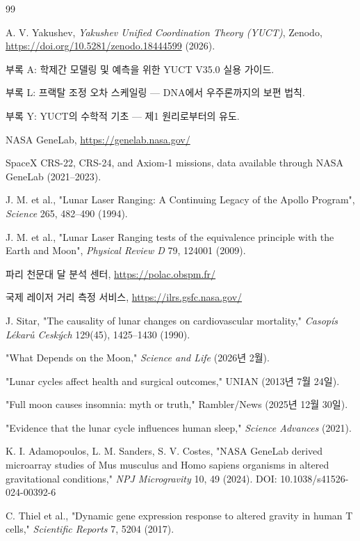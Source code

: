 \documentclass[12pt,a4paper]{article}
\theoremstyle{remark}
\begin{document}
	\begin{thebibliography}{99}
		
		A. V. Yakushev, \emph{Yakushev Unified Coordination Theory (YUCT)}, Zenodo, \url{https://doi.org/10.5281/zenodo.18444599} (2026).
		
		부록 A: 학제간 모델링 및 예측을 위한 YUCT V35.0 실용 가이드.
		
		부록 L: 프랙탈 조정 오차 스케일링 — DNA에서 우주론까지의 보편 법칙.
		
		부록 Y: YUCT의 수학적 기초 — 제1 원리로부터의 유도.
		
		NASA GeneLab, \url{https://genelab.nasa.gov/}
		
		SpaceX CRS-22, CRS-24, and Axiom-1 missions, data available through NASA GeneLab (2021–2023).
		
		J. M. et al., "Lunar Laser Ranging: A Continuing Legacy of the Apollo Program", \emph{Science} 265, 482–490 (1994).
		
		J. M. et al., "Lunar Laser Ranging tests of the equivalence principle with the Earth and Moon", \emph{Physical Review D} 79, 124001 (2009).
		
		파리 천문대 달 분석 센터, \url{https://polac.obspm.fr/}
		
		국제 레이저 거리 측정 서비스, \url{https://ilrs.gsfc.nasa.gov/}
		
		J. Sitar, "The causality of lunar changes on cardiovascular mortality," \emph{Casopís Lékarů Ceských} 129(45), 1425–1430 (1990).
		
		"What Depends on the Moon," \emph{Science and Life} (2026년 2월).
		
		"Lunar cycles affect health and surgical outcomes," UNIAN (2013년 7월 24일).
		
		"Full moon causes insomnia: myth or truth," Rambler/News (2025년 12월 30일).
		
		"Evidence that the lunar cycle influences human sleep," \emph{Science Advances} (2021).
		
		K. I. Adamopoulos, L. M. Sanders, S. V. Costes, "NASA GeneLab derived microarray studies of Mus musculus and Homo sapiens organisms in altered gravitational conditions," \emph{NPJ Microgravity} 10, 49 (2024). DOI: 10.1038/s41526-024-00392-6
		
		C. Thiel et al., "Dynamic gene expression response to altered gravity in human T cells," \emph{Scientific Reports} 7, 5204 (2017).
		
	\end{thebibliography}
	
\end{document}
